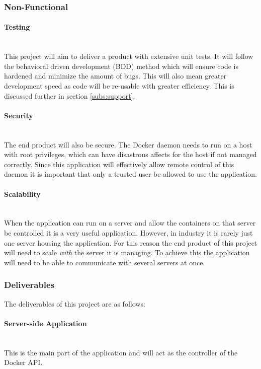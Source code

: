 \subsubsection{Non-Functional}

\paragraph{Testing}\mbox{}\\
This project will aim to deliver a product with extensive unit tests. It will follow the behavioral driven development (BDD) method which will ensure code is hardened and minimize the amount of bugs. This will also mean greater development speed as code will be re-usable with greater efficiency. This is discussed further in section \ref{subs:support}.

\paragraph{Security}\mbox{}\\
The end product will also be secure. The Docker daemon needs to run on a host with root privileges, which can have disastrous affects for the host if not managed correctly. Since this application will effectively allow remote control of this daemon it is important that only a trusted user be allowed to use the application. 

\paragraph{Scalability}\mbox{}\\
When the application can run on a server and allow the containers on that server be controlled it is a very useful application. However, in industry it is rarely just one server housing the application. For this reason the end product of this project will need to scale \textit{with} the server it is managing. To achieve this the application will need to be able to communicate with several servers at once.

\subsubsection{Deliverables}
The deliverables of this project are as follows:

\paragraph{Server-side Application}\mbox{}\\
This is the main part of the application and will act as the controller of the Docker API.

